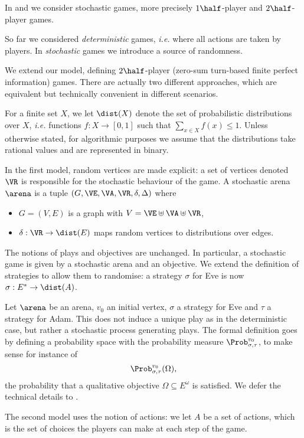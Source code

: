 

In  and  we consider stochastic games,
more precisely $1\half$-player and $2\half$-player games.

So far we considered \textit{deterministic} games, \textit{i.e.} where all actions are taken by players.
In \textit{stochastic} games we introduce a source of randomness.

We extend our model, defining $2\half$-player (zero-sum turn-based finite perfect information) games.
There are actually two different approaches, which are equivalent but technically convenient in different scenarios.

For a finite set $X$, we let $\dist(X)$ denote the set of probabilistic distributions over $X$,
\textit{i.e.} functions $f : X \to [0,1]$ such that $\sum_{x \in X} f(x) \le 1$.
Unless otherwise stated, for algorithmic purposes we assume that the distributions take rational values and are represented in binary.

In the first model, random vertices are made explicit: a set of vertices denoted $\VR$ is responsible for the stochastic behaviour of the game.
A stochastic arena $\arena$ is a tuple $(G,\VE,\VA,\VR,\delta,\Delta)$ where 
\begin{itemize}
	\item $G = (V,E)$ is a graph with $V = \VE \uplus \VA \uplus \VR$,
	\item $\delta : \VR \to \dist(E)$ maps random vertices to distributions over edges.
\end{itemize}

The notions of plays and objectives are unchanged.
In particular, a stochastic game is given by a stochastic arena and an objective.
We extend the definition of strategies to allow them to randomise:
a strategy $\sigma$ for Eve is now $\sigma : E^* \to \dist(A)$.

Let $\arena$ be an arena, $v_0$ an initial vertex, $\sigma$ a strategy for Eve and $\tau$ a strategy for Adam.
This does not induce a unique play as in the deterministic case, but rather a stochastic process generating plays.
The formal definition goes by defining a probability space with the probability measure
$\Prob^{v_0}_{\sigma,\tau}$, to make sense for instance of
\[
\Prob^{v_0}_{\sigma,\tau}(\Omega),
\]
the probability that a qualitative objective $\Omega \subseteq E^\omega$ is satisfied.
We defer the technical details to .

The second model uses the notion of actions: we let $A$ be a set of actions, 
which is the set of choices the players can make at each step of the game.

